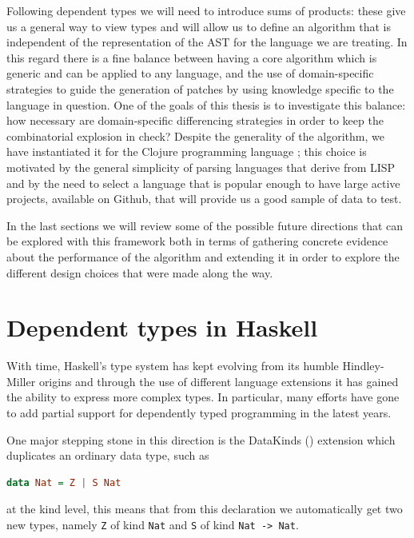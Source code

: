 \documentclass[11pt]{article}
\begin{document}
 Following dependent types we will need to introduce sums of products: these give us a general way to view 
types and will allow us to define an algorithm that is independent of the representation of the AST for the language 
we are treating. In this regard there is a fine balance between having a core algorithm which is generic and can 
be applied to any language, and the use of domain-specific strategies to guide the generation of patches by using 
knowledge specific to the language in question. One of the goals of this thesis is to investigate this balance: 
how necessary are domain-specific differencing strategies in order to keep the combinatorial explosion in check? 
Despite the generality of the algorithm, we have instantiated it for the Clojure programming language 
\cite{clojure}; this choice is motivated by the general simplicity of parsing languages that derive from 
LISP and by the need to select a language that is popular enough to have large 
active projects, available on Github, that will provide us a good sample of data 
to test.

In the last sections we will review some of the possible 
future directions that can be explored with this framework both in terms of 
gathering concrete evidence about the performance of the algorithm and extending 
it in order to explore the different design choices that were made along the way.

\section{Dependent types in
Haskell}\label{dependent-types-in-haskell}

With time, Haskell's type system has kept evolving from its humble
Hindley-Miller origins and through the use of different language extensions it has gained the ability 
to express more complex types. In particular, many efforts have gone to add partial support for dependently
typed programming in the latest years.

One major stepping stone in this direction is the DataKinds (\cite{datakinds}) extension which duplicates an ordinary data type, such as

\begin{lstlisting}[language=haskell]
data Nat = Z | S Nat
\end{lstlisting}

at the kind level, this means that from this declaration we automatically get two new types, namely \texttt{Z} of kind \texttt{Nat}
and \texttt{S} of kind \texttt{Nat\ -\textgreater{}\ Nat}.
\end{document}
